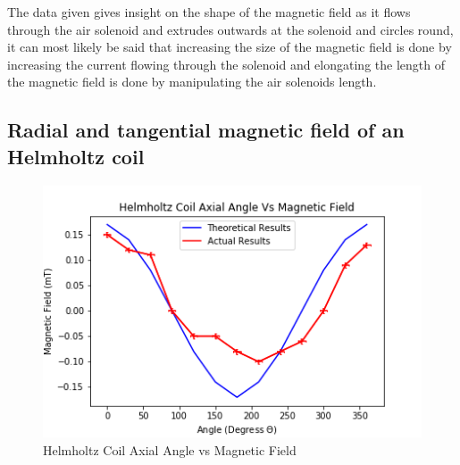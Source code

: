 \documentclass[12pt]{article}
\begin{document}
The data given gives insight on the shape of the magnetic field as it flows through the air solenoid and extrudes outwards at the solenoid and circles round, it can most likely be said that increasing the size of the magnetic field is done by increasing the current flowing through the solenoid and elongating the length of the magnetic field is done by manipulating the air solenoids length.

\subsection{Radial and tangential magnetic field of an Helmholtz coil}
\label{radial coil}

\begin{figure}[H]
\centering
\includegraphics[scale=0.7]{Images/Helmholtz_Coils/Helmholtz_Coil_Angle_1_Vs_Magnetic_Field.png}
\caption{Helmholtz Coil Axial Angle vs Magnetic Field}
\label{Helmholtz Coil Axial Angle Vs Magnetic Field Graph}
\end{figure}
\end{document}
